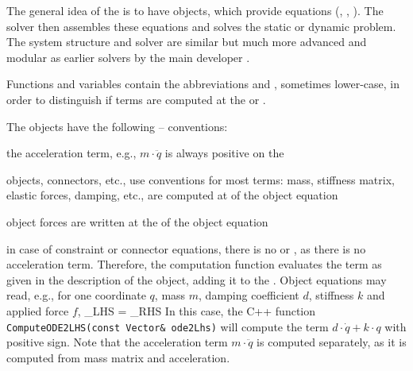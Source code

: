 %
The general idea of the \codeName is to have objects, which provide equations (, , ).
The solver then assembles these equations and solves the static or dynamic problem.
The system structure and solver are similar but much more advanced and modular as earlier solvers by the main developer \cite{GerstmayrStangl2004,Gerstmayr2009,GerstmayrEtAl2013}.

Functions and variables contain the abbreviations  and , sometimes lower-case, in order
to distinguish if terms are computed at the  or .

The objects have the following -- conventions:
\bi
  \item the acceleration term, e.g., $m \cdot \ddot q$ is always positive on the 
  \item objects, connectors, etc., use  conventions for most terms: mass, stiffness matrix, elastic forces, damping, etc., are computed at  of the object equation
  \item object forces are written at the  of the object equation
  \item in case of constraint or connector equations, there is no  or , as there is no acceleration term. 
\ei
Therefore, the computation function evaluates the term as given in the description of the object, adding it to the .
Object equations may read, e.g., for one coordinate $q$, mass $m$, damping coefficient $d$, stiffness $k$ and applied force $f$,
\be
  _{LHS} = _{RHS}
\ee 
In this case, the C++ function \texttt{ComputeODE2LHS(const Vector\& ode2Lhs)} will compute the term
$d \cdot \dot q + k \cdot q$ with positive sign. Note that the acceleration term $m \cdot \ddot q$ is computed separately, as it 
is computed from mass matrix and acceleration.

